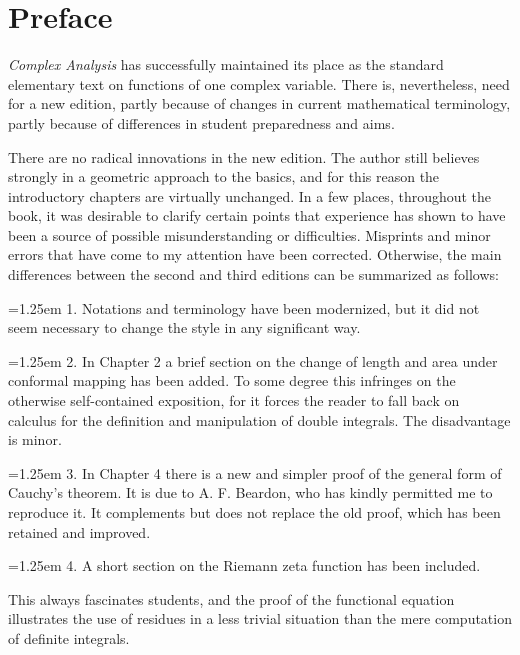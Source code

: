 \chapter*{Preface}
\hypertarget{orig-front-xiii}{}
\textit{Complex Analysis} has successfully maintained its place as the standard elementary text on functions of one complex variable. There is, nevertheless, need for a new edition, partly because of changes in current mathematical terminology, partly because of differences in student preparedness and aims.

There are no radical innovations in the new edition. The author still believes strongly in a geometric approach to the basics, and for this reason the introductory chapters are virtually unchanged. In a few places, throughout the book, it was desirable to clarify certain points that experience has shown to have been a source of possible misunderstanding or difficulties. Misprints and minor errors that have come to my attention have been corrected. Otherwise, the main differences between the second and third editions can be summarized as follows:

\par\hangindent=1.25em 1. Notations and terminology have been modernized, but it did not seem necessary to change the style in any significant way.

\par\hangindent=1.25em 2. In Chapter 2 a brief section on the change of length and area under conformal mapping has been added. To some degree this infringes on the otherwise self-contained exposition, for it forces the reader to fall back on calculus for the definition and manipulation of double integrals. The disadvantage is minor.

\par\hangindent=1.25em 3. In Chapter 4 there is a new and simpler proof of the general form of Cauchy’s theorem. It is due to A. F. Beardon, who has kindly permitted me to reproduce it. It complements but does not replace the old proof, which has been retained and improved.

\par\hangindent=1.25em 4. A short section on the Riemann zeta function has been included.

This always fascinates students, and the proof of the functional equation illustrates the use of residues in a less trivial situation than the mere computation of definite integrals.

